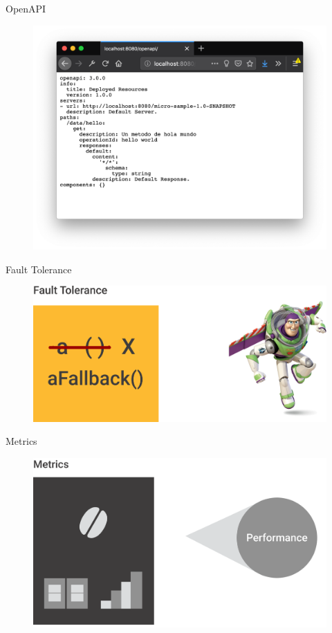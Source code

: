 \documentclass[aspectratio=169]{beamer}
\begin{document}
\begin{frame}{OpenAPI}
\begin{figure}
	\centering
	\includegraphics[width=0.75\linewidth]{Images/openapi}
\end{figure}
\end{frame}


\begin{frame}{Fault Tolerance}
\begin{figure}
	\centering
	\includegraphics[width=0.75\linewidth]{Images/faulttolerance}
\end{figure}
\end{frame}

\begin{frame}{Metrics}
\begin{figure}
	\centering
	\includegraphics[width=0.75\linewidth]{Images/metrics}
\end{figure}
\end{frame}
\end{document}
